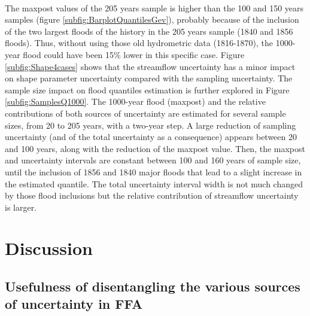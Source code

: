 \documentclass[11pt]{article}
\begin{document}
        \paragraph{}
        The maxpost values of the 205 years sample is higher than the 100 and 150 years samples (figure \ref{subfig:BarplotQuantilesGev}), probably because of the inclusion of the two largest floods of the history in the 205 years sample (1840 and 1856 floods). Thus, without using those old hydrometric data (1816-1870), the 1000-year flood could have been 15\% lower in this specific case. Figure \ref{subfig:Shape4cases} shows that the streamflow uncertainty has a minor impact on shape parameter uncertainty compared with the sampling uncertainty. The sample size impact on flood quantiles estimation is further explored in Figure \ref{subfig:SamplesQ1000}. The 1000-year flood (maxpost) and the relative contributions of both sources of uncertainty are estimated for several sample sizes, from 20 to 205 years, with a two-year step. A large reduction of sampling uncertainty (and of the total uncertainty as a consequence) appears between 20 and 100 years, along with the reduction of the maxpost value. Then, the maxpost and uncertainty intervals are constant between 100 and 160 years of sample size, until the inclusion of 1856 and 1840 major floods that lead to a slight increase in the estimated quantile. The total uncertainty interval width is not much changed by those flood inclusions but the relative contribution of streamflow uncertainty is larger.
\FloatBarrier
\section{Discussion}
\label{sec:Discussion}
    \subsection{Usefulness of disentangling the various sources of uncertainty in FFA}

\end{document}
